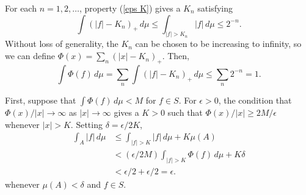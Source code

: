 \documentclass[12pt]{article}
\begin{document}

For each $n=1,2,\ldots$, property (\ref{eps K}) gives a $K_n$ satisfying
\begin{equation*}
\int (|f|-K_n)_+\,d\mu\le\int_{|f|>K_n}|f|\,d\mu\le 2^{-n}.
\end{equation*}
Without loss of generality, the $K_n$ can be chosen to be increasing to infinity, so we can define $\Phi(x)=\sum_n(|x|-K_n)_+$. Then,
\begin{equation*}
\int\Phi(f)\,d\mu=\sum_n\int(|f|-K_n)_+\,d\mu\le\sum_n 2^{-n}=1.
\end{equation*}


First, suppose that $\int\Phi(f)\,d\mu< M$ for $f\in S$.
For $\epsilon>0$, the condition that $\Phi(x)/|x|\rightarrow\infty$ as $|x|\rightarrow\infty$ gives a $K>0$ such that $\Phi(x)/|x|\ge 2M/\epsilon$ whenever $|x|>K$.
Setting $\delta=\epsilon/2K$,
\begin{equation*}\begin{split}
\int_A|f|\,d\mu
&\le \int_{|f|>K}|f|\,d\mu +K\mu(A)\\
&< (\epsilon/2M)\int_{|f|>K}\Phi(f)\,d\mu +K\delta\\
&< \epsilon/2 +\epsilon/2 =\epsilon.
\end{split}\end{equation*}
whenever $\mu(A)<\delta$ and $f\in S$.

\end{document}
